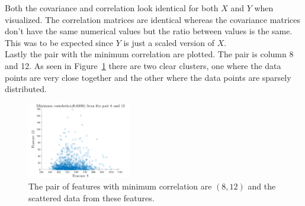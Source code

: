 \documentclass{article}
\begin{document}
\noindent Both the covariance and correlation look identical for both $X$ and $Y$ when visualized. The correlation matrices are identical whereas the covariance matrices don't have the same numerical values but the ratio between values is the same. This was to be expected since $Y$ is just a scaled version of $X$.\\
Lastly the pair with the minimum correlation are plotted. The pair is column 8 and 12. As seen in Figure~\ref{fig:scatter} there are two clear clusters, one where the data points are very close together and the other where the data points are sparsely distributed.

\begin{figure}[H]
    \centering
    \includegraphics[width=0.4\textwidth]{Figures/plot2_2_scatter.png}
    \caption{The pair of features with minimum correlation are $(8,12)$ and the scattered data from these features. }
    \label{fig:scatter}
\end{figure}
\end{document}

